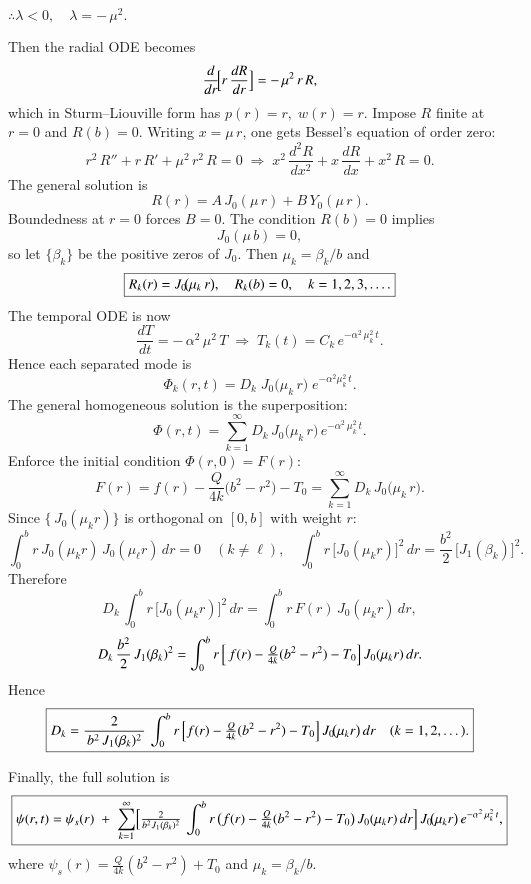 \documentclass{report}
\begin{document}
\(\displaystyle\therefore\lambda < 0,\quad \lambda = -\,\mu^{2}.\)

Then the radial ODE becomes
\[
\frac{d}{dr}\!\Bigl[r\,\frac{dR}{dr}\Bigr] = -\,\mu^{2}\,r\,R,
\]
which in Sturm–Liouville form has \(p(r)=r,\;w(r)=r\).  Impose \(R\) finite at \(r=0\) and \(R(b)=0\).  Writing \(x = \mu\,r\), one gets Bessel’s equation of order zero:
\[
r^{2}\,R'' + r\,R' + \mu^{2}\,r^{2}\,R = 0 
\;\Longrightarrow\; 
x^{2}\,\frac{d^{2}R}{dx^{2}} + x\,\frac{dR}{dx} + x^{2}\,R = 0.
\]
The general solution is
\[
R(r) = A\,J_{0}(\mu\,r) + B\,Y_{0}(\mu\,r).
\]
Boundedness at \(r=0\) forces \(B=0\).  The condition \(R(b)=0\) implies
\[
J_{0}(\mu\,b) = 0,
\]
so let \(\{\beta_{k}\}\) be the positive zeros of \(J_{0}\).  Then \(\mu_{k} = \beta_{k}/b\) and
\[
\boxed{%
R_{k}(r) = J_{0}\!\bigl(\mu_{k}\,r\bigr),\quad
R_{k}(b) = 0,\quad k=1,2,3,\ldots.
}
\]
The temporal ODE is now
\[
\frac{dT}{dt} = -\,\alpha^{2}\,\mu^{2}\,T
\;\Longrightarrow\; 
T_{k}(t) = C_{k}\,e^{-\alpha^{2}\,\mu_{k}^{2}\,t}.
\]
Hence each separated mode is
\[
\Phi_{k}(r,t) = D_{k}\;J_{0}\bigl(\mu_{k}\,r\bigr)\;e^{-\alpha^{2} \mu_{k}^{2}\,t}.
\]
The general homogeneous solution is the superposition:
\[
\Phi(r,t)
= \sum_{k=1}^{\infty}
D_{k}\,J_{0}\bigl(\mu_{k}\,r\bigr)\,e^{-\alpha^{2}\,\mu_{k}^{2}\,t}.
\]
Enforce the initial condition \(\Phi(r,0) = F(r)\):
\[
F(r) 
= f(r) - \frac{Q}{4k}\bigl(b^{2}-r^{2}\bigr) - T_{0}
= \sum_{k=1}^{\infty} D_{k}\,J_{0}\bigl(\mu_{k}\,r\bigr).
\]
Since \(\{\,J_{0}(\mu_{k}r)\}\) is orthogonal on \([0,b]\) with weight \(r\):
\[
\int_{0}^{b} r\,J_{0}(\mu_{k}r)\,J_{0}(\mu_{\ell}r)\,dr = 0\quad(k\neq \ell),
\quad
\int_{0}^{b} r\,\bigl[J_{0}(\mu_{k}r)\bigr]^{2}\,dr 
= \frac{b^{2}}{2}\,\bigl[J_{1}(\beta_{k})\bigr]^{2}.
\]
Therefore
\[
D_{k}\,\int_{0}^{b} r\,\bigl[J_{0}(\mu_{k}r)\bigr]^{2}\,dr
= \int_{0}^{b} r\,F(r)\,J_{0}(\mu_{k}r)\,dr,
\]
\[
D_{k}\,\frac{b^{2}}{2}\,J_{1}(\beta_{k})^{2}
= \int_{0}^{b} r\,\Bigl[\,f(r) - \tfrac{Q}{4k}(b^{2}-r^{2}) - T_{0}\Bigr]\,
J_{0}(\mu_{k}r)\,dr.
\]
Hence
\[
\boxed{%
D_{k}
= \frac{2}{\,b^{2}\,J_{1}(\beta_{k})^{2}\,}\,
\int_{0}^{b} r\,\Bigl[f(r) - \tfrac{Q}{4k}(b^{2}-r^{2}) - T_{0}\Bigr]\,
J_{0}\!\bigl(\mu_{k}r\bigr)\,dr
\quad (k=1,2,\dots).
}
\]

Finally, the full solution is
\[
\boxed{%
\psi(r,t) 
= \psi_{s}(r) \;+\; \sum_{k=1}^{\infty}
\Bigl[\tfrac{2}{b^{2}J_{1}(\beta_{k})^{2}}\,
\int_{0}^{b} r\,\bigl(f(r) - \tfrac{Q}{4k}(b^{2}-r^{2}) - T_{0}\bigr)\,
J_{0}(\mu_{k}r)\,dr\Bigr]\,
J_{0}\!\bigl(\mu_{k}r\bigr)\,e^{-\alpha^{2}\,\mu_{k}^{2}\,t},
}
\]
where \(\psi_{s}(r) = \frac{Q}{4k}(b^{2} - r^{2}) + T_{0}\) and \(\mu_{k} = \beta_{k}/b\).
\end{document}
